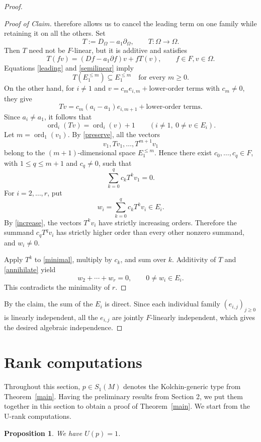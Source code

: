 \documentclass[11pt,a4paper]{amsart}
\newtheorem{proposition}[theorem]{Proposition}
\theoremstyle{definition}
\newcommand{\ord}{\operatorname{ord}}
\begin{document}
\begin{proof}
\begin{proof}[Proof of Claim]
therefore allows us to cancel the leading term on one
family while retaining it on all the others. Set
\[
 T:=D_\Omega-a_1\partial_\Omega, \qquad T:\Omega\longrightarrow \Omega.
\]
Then $T$ need not be $F$-linear, but it is additive and satisfies
\begin{equation}\label{semilinear}
 T(fv)=(Df-a_1\partial f)v+fT(v),\qquad f\in F, v\in \Omega.
\end{equation}
Equations \eqref{leading} and \eqref{semilinear} imply
\begin{equation}\label{preserve}
 T\left(E_1^{\leqslant m}\right)\subseteq E_1^{\leqslant m}
 \quad\text{for every }m\geqslant0.
\end{equation}
On the other hand, for $i\neq1$ and
$v=c_m e_{i,m}+\text{lower-order terms}$ with $c_m\neq0$, they give
\[
 Tv=c_m(a_i-a_1)e_{i,m+1}+\text{lower-order terms}.
\]
Since $a_i\neq a_1$, it follows that
\begin{equation}\label{increase}
 \ord_i(Tv)=\ord_i(v)+1
 \qquad(i\neq1,\ 0\neq v\in E_i).
\end{equation}
Let $m=\ord_1(v_1)$. By \eqref{preserve}, all the vectors
\[
 v_1,Tv_1,\ldots,T^{m+1}v_1
\]
belong to the $(m+1)$-dimensional space $E_1^{\leqslant m}$. Hence there
exist $c_0,\ldots,c_q\in F$, with $1\leqslant q\leqslant m+1$ and $c_q\neq0$,
such that
\begin{equation}\label{annihilate}
 \sum_{k=0}^q c_kT^kv_1=0.
\end{equation}
For $i=2,\ldots,r$, put
\[
 w_i=\sum_{k=0}^q c_kT^kv_i\in E_i.
\]
By \eqref{increase}, the vectors $T^kv_i$ have strictly increasing
orders. Therefore the summand $c_qT^qv_i$ has strictly higher order
than every other nonzero summand, and $w_i\neq0$.

Apply $T^k$ to \eqref{minimal}, multiply by $c_k$, and sum over $k$.
Additivity of $T$ and \eqref{annihilate} yield
\[
 w_2+\cdots+w_r=0,\qquad 0\neq w_i\in E_i.
\]
This contradicts the minimality of $r$.
\end{proof}
By the claim, the sum of the $E_i$ is direct. Since each individual
family $(e_{i,j})_{j\geqslant0}$ is linearly independent, all the
$e_{i,j}$ are jointly $F$-linearly independent, which gives the desired algebraic independence.
\end{proof}

\section{Rank computations}\label{sec3}
Throughout this section, $p\in S_1(M)$ denotes the
Kolchin-generic type from Theorem~\ref{main}. Having the preliminary results from Section 2, we put them together in this section to obtain a proof of Theorem~\ref{main}. We start from the U-rank computations.
\begin{proposition}\label{minimality}
We have $U(p)=1$.
\end{proposition}
\end{document}
